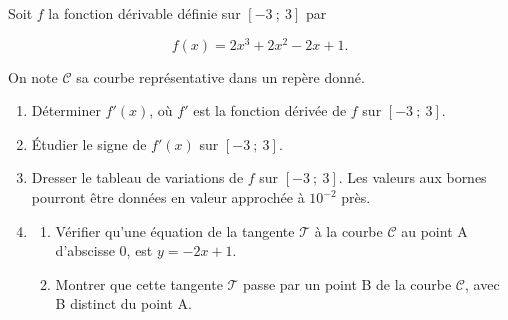 \medskip


Soit $f$ la fonction dérivable définie sur $[-3~;~3]$ par 

\[f(x) = 2x^3 + 2x^2 - 2x + 1.\]

On note $\mathcal{C}$ sa courbe représentative dans un repère donné.

\medskip

\begin{enumerate}
\item Déterminer $f'(x)$, où $f'$ est la fonction dérivée de $f$ sur $[-3~;~3]$.
\item Étudier le signe de $f'(x)$ sur $[-3~;~3]$.
\item Dresser le tableau de variations de $f$ sur $[-3~;~3]$. Les valeurs aux bornes pourront être
données en valeur approchée à $10^{-2}$ près.
\item 
	\begin{enumerate}
		\item  Vérifier qu'une équation de la tangente $\mathcal{T}$ à la courbe $\mathcal{C}$ au point A d'abscisse 0, est $y = -2x + 1$.
		\item Montrer que cette tangente $\mathcal{T}$ passe par un point B de la courbe $\mathcal{C}$, avec B distinct du point A.
	\end{enumerate}
\end{enumerate}
